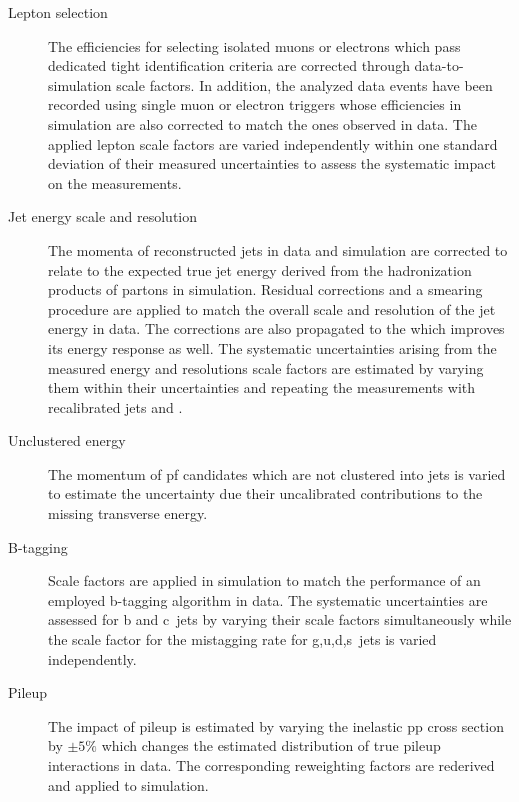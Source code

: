 \begin{description}
\item[Lepton selection] The efficiencies for selecting isolated muons or electrons which pass dedicated tight identification criteria are corrected through data-to-simulation scale factors. In addition, the analyzed data events have been recorded using single muon or electron triggers whose efficiencies in simulation are also corrected to match the ones observed in data. The applied lepton scale factors are varied independently within one standard deviation of their measured uncertainties to assess the systematic impact on the measurements.
\item[Jet energy scale and resolution] The momenta of reconstructed jets in data and simulation are corrected to relate to the expected true jet energy derived from the hadronization products of partons in simulation. Residual corrections and a smearing procedure are applied to match the overall scale and resolution of the jet energy in data. The corrections are also propagated to the \met which improves its energy response as well. The systematic uncertainties arising from the measured energy and resolutions scale factors are estimated by varying them within their uncertainties and repeating the measurements with recalibrated jets and \met.
\item[Unclustered energy] The momentum of \gls{pf} candidates which are not clustered into jets is varied to estimate the uncertainty due their uncalibrated contributions to the missing transverse energy.
\item[B-tagging] Scale factors are applied in simulation to match the performance of an employed b-tagging algorithm in data. The systematic uncertainties are assessed for b and c~jets by varying their scale factors simultaneously while the scale factor for the mistagging rate for g,u,d,s~jets is varied independently.
\item[Pileup] The impact of pileup is estimated by varying the inelastic \gls{pp} cross section by $\pm5\%$ which changes the estimated distribution of true pileup interactions in data. The corresponding reweighting factors are rederived and applied to simulation.
\end{description}

